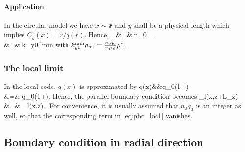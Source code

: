 \paragraph{Application}
In the circular model we have $x\sim \Psi$ and $y$ shall be a physical length which implies
$C_y(x) = r/q(r)$. Hence, 
\bea
\kymin\rho_\rf &=& n_0  \rho_\rf \nn \\
 &=& k_{y0}^{\rm min} 
\eea
with $k_{y0}^{\rm min} \rho_{\mathrm{ref}}=\frac{n_0 q_0}{r_0/a}\rho^*$.

\subsubsection{The local limit}
In the local code, $q(x)$ is approximated by
\bea
q(x)&\approx&q_0\left(1+\right) \\
 &=& q_0\left(1+\right).
\eea
Hence, the parallel boundary condition becomes
\bea
{}_l(x,z+L_z) &=& _l(x,z) \exp{\left[-2\pi{\rm i} n_0 q_0 l\right]} . \label{eq:pbc_loc1}
\eea
For convenience, it is usually assumed that $n_0q_0$ is an integer as well, so that the corresponding term in 
\ref{eq:pbc_loc1} vanishes. 


\subsection{Boundary condition in radial direction}
\label{sec:xbound}




